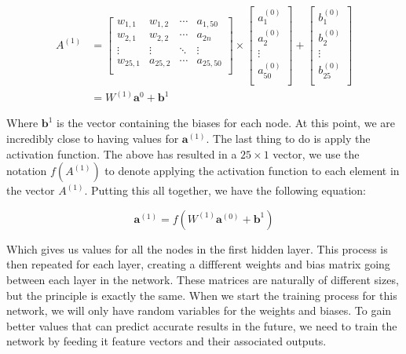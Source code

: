 \begin{align}
    A^{(1)} &= \left[ {\begin{array}{cccc}
        w_{1,1} & w_{1,2} & \cdots & a_{1,50}\\
        w_{2,1} & w_{2,2} & \cdots & a_{2n}\\
        \vdots & \vdots & \ddots & \vdots\\
        w_{25,1} & a_{25,2} & \cdots & a_{25,50}\\
      \end{array} } \right] \times \left[ \begin{array}{c}
          a^{(0)}_1 \\
          a^{(0)}_2 \\
          \vdots \\
          a^{(0)}_{50} \\
      \end{array} \right] + \left[ \begin{array}{c}
        b^{(0)}_1 \\
        b^{(0)}_2 \\
        \vdots \\
        b^{(0)}_{25} \\
        \end{array} \right] \\
      &= W^{(1)}\textbf{a}^{0} + \textbf{b}^1
\end{align}

Where $\textbf{b}^1$ is the vector containing the biases for each node.  At this point, we are incredibly close to having values for $\textbf{a}^{(1)}$. The last thing to do
is apply the activation function. The above has resulted in a $25\times 1$ vector, we use the notation $f(A^{(1)})$ to denote applying the activation function to each 
element in the vector $A^{(1)}$. Putting this all together, we have the following equation:

\begin{equation}
    \textbf{a}^{(1)} = f(W^{(1)}\textbf{a}^{(0)} + \textbf{b}^{1})
\end{equation}

Which gives us values for all the nodes in the first hidden layer. This process is then repeated for each layer, creating a diffferent weights and bias matrix going between each layer in the network. 
These matrices are naturally of different sizes, but the principle is exactly the same. When we start the training process for this network, we will only have random variables for the weights and biases. 
To gain better values that can predict accurate results in the future, we need to train the network by feeding it feature vectors and their associated outputs. \\

